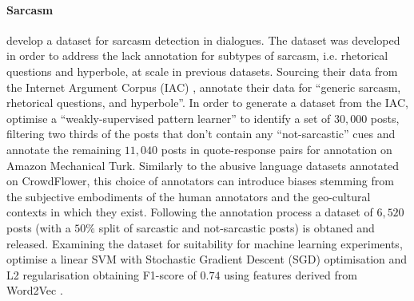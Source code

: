 \paragraph*{Sarcasm} \citet{Oraby_sarcasm:2016} develop a dataset for sarcasm detection in dialogues. The dataset was developed in order to address the lack annotation for subtypes of sarcasm, i.e. rhetorical questions and hyperbole, at scale in previous datasets.
Sourcing their data from the Internet Argument Corpus (IAC) \citep{Abbott:2016}, \citet{Oraby_sarcasm:2016} annotate their data for ``generic sarcasm, rhetorical questions, and hyperbole''.
In order to generate a dataset from the IAC, \citet{Oraby_sarcasm:2016} optimise a ``weakly-supervised pattern learner'' \citep{Oraby_sarcasm:2016} to identify a set of $30,000$ posts, filtering two thirds of the posts that don't contain any ``not-sarcastic'' cues and annotate the remaining $11,040$ posts in quote-response pairs for annotation on Amazon Mechanical Turk.
Similarly to the abusive language datasets annotated on CrowdFlower, this choice of annotators can introduce biases stemming from the subjective embodiments of the human annotators and the geo-cultural contexts in which they exist.
Following the annotation process a dataset of $6,520$ posts (with a $50\%$ split of sarcastic and not-sarcastic posts) is obtaned and released.
Examining the dataset for suitability for machine learning experiments, \citet{Oraby_sarcasm:2016} optimise a linear SVM with Stochastic Gradient Descent (SGD) optimisation and L2 regularisation obtaining F1-score of $0.74$ using features derived from Word2Vec \citep{Mikolov:2010}.

